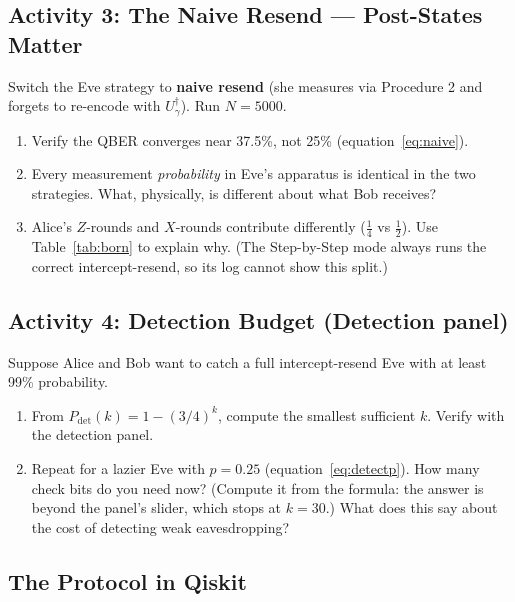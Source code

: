 \documentclass[a4paper,11pt]{article}
\begin{document}
\subsection{Activity 3: The Naive Resend --- Post-States Matter}

\begin{studentbox}
Switch the Eve strategy to \textbf{naive resend} (she measures via Procedure 2 and
forgets to re-encode with $U_\gamma^\dagger$). Run $N = 5000$.
\begin{enumerate}
    \item Verify the QBER converges near 37.5\%, not 25\%
          (equation~\eqref{eq:naive}).
    \item Every measurement \emph{probability} in Eve's apparatus is identical in
          the two strategies. What, physically, is different about what Bob
          receives?
    \item Alice's $Z$-rounds and $X$-rounds contribute differently ($\tfrac{1}{4}$
          vs $\tfrac{1}{2}$). Use Table~\ref{tab:born} to explain why. (The Step-by-Step
          mode always runs the correct intercept-resend, so its log cannot show this split.)
\end{enumerate}
\end{studentbox}

\subsection{Activity 4: Detection Budget (Detection panel)}

\begin{studentbox}
Suppose Alice and Bob want to catch a full intercept-resend Eve with at least 99\%
probability.
\begin{enumerate}
    \item From $P_{\text{det}}(k) = 1 - (3/4)^k$, compute the smallest sufficient
          $k$. Verify with the detection panel.
    \item Repeat for a lazier Eve with $p = 0.25$
          (equation~\eqref{eq:detectp}). How many check bits do you need now? (Compute
          it from the formula: the answer is beyond the panel's slider, which stops at
          $k = 30$.) What does this say about the cost of detecting weak eavesdropping?
\end{enumerate}
\end{studentbox}

\subsection{The Protocol in Qiskit}
\end{document}
